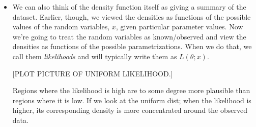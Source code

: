 \begin{itemize}
  We can use the factorization thoerem to prove that $\min_i X_i$ and
  $\max_i X_i$ are sufficient statistics for the uniform$(a,b)$.
  \begin{ex}
    The joint pdf of $X₁,...,X_n$ is
    \begin{align*}
      f(x₁,...,x_n; a, b)
      &= ∏_{i=1}^n \tfrac{1}{b-a} \1\{x_i ∈ [a,b]\} \\
      &= \Big(\tfrac{1}{b-a}\Big)^n \1\{a ≤ \min_i x_i \& \max_i x_i ≤ b\},
    \end{align*}
    so we can define $h(x) = 1$ and
    \begin{equation*}
      g(T(x); a, b) = \Big(\tfrac{1}{b-a}\Big)^n \1\{a ≤ \min_i x_i \& \max_i x_i ≤ b\}.
    \end{equation*}
  \end{ex}

\item We can also think of the density function itself as giving a
  summary of the dataset.
  Earlier, though, we viewed the densities as functions of the
  possible values of the random variables, $x$, given particular
  parameter values.  Now we're going to treat the random variables as
  known/observed and view the densities as functions of the possible
  parametrizations.  When we do that, we call them \emph{likelihoods}
  and will typically write them as $L(θ; x)$.

  [PLOT PICTURE OF UNIFORM LIKELIHOOD.]

  Regions where the likelihood is high are to some degree more
  plausible than regions where it is low.  If we look at the uniform
  dist; when the likelihood is higher, its corresponding density is
  more concentrated around the observed data.

\end{itemize}

